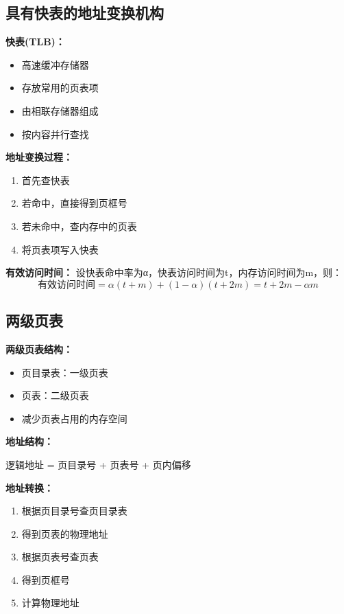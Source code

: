 \documentclass[lang=cn,newtx,10pt,scheme=chinese]{../../elegantbook}
\begin{document}
\subsection{具有快表的地址变换机构}

\textbf{快表(TLB)：}
\begin{itemize}
  \item 高速缓冲存储器
  \item 存放常用的页表项
  \item 由相联存储器组成
  \item 按内容并行查找
\end{itemize}

\textbf{地址变换过程：}
\begin{enumerate}
  \item 首先查快表
  \item 若命中，直接得到页框号
  \item 若未命中，查内存中的页表
  \item 将页表项写入快表
\end{enumerate}

\textbf{有效访问时间：}
设快表命中率为α，快表访问时间为t，内存访问时间为m，则：
$$\text{有效访问时间} = α(t + m) + (1-α)(t + 2m) = t + 2m - αm$$

\subsection{两级页表}

\textbf{两级页表结构：}
\begin{itemize}
  \item 页目录表：一级页表
  \item 页表：二级页表
  \item 减少页表占用的内存空间
\end{itemize}

\textbf{地址结构：}
\begin{center}
逻辑地址 = 页目录号 + 页表号 + 页内偏移
\end{center}

\textbf{地址转换：}
\begin{enumerate}
  \item 根据页目录号查页目录表
  \item 得到页表的物理地址
  \item 根据页表号查页表
  \item 得到页框号
  \item 计算物理地址
\end{enumerate}
\end{document}
